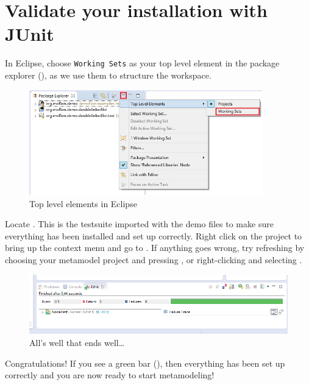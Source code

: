 \clearpage
\genHeader
\hypertarget{validate common}{} 
\chapter{Validate your installation with JUnit}

\begin{stepbystep}

\item  In Eclipse, choose \texttt{Working Sets} as your top level element in the package explorer (), as we use them to structure the workspace.

\begin{figure}[htbp]
	\centering
  \includegraphics[width=0.9\textwidth]{../../org.moflon.doc.handbook.01_installation/3_validate/va_images/eclipse_explorerWorkingsets}
	\caption{Top level elements in Eclipse}
	\label{eclipse:topLevel}
\end{figure}

\item 
Locate .
This is the testsuite imported with the demo files to make sure everything has been installed and set up correctly.
Right click on the project to bring up the context menu and go to .
If anything goes wrong, try refreshing by choosing your metamodel project and pressing , or right-clicking and selecting .

\begin{figure}[htbp]
	\centering
  \includegraphics[width=1\textwidth]{../../org.moflon.doc.handbook.01_installation/3_validate/va_images/eclipse_passedJUnitTest}
	\caption{All's well that ends well\ldots}
	\label{eclipse:passedTest}
\end{figure}

\vspace{0.5cm}

Congratulations!
If you see a green bar (), then everything has been set up correctly and you are now ready to start metamodeling!

\end{stepbystep}